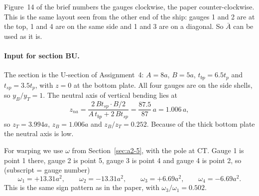 Figure~14 of the brief numbers the gauges clockwise, the paper counter-clockwise. This is the same layout seen from the other end of the ship: gauges 1 and 2 are at the top, 1 and 4 are on the same side and 1 and 3 are on a diagonal. So $\bar A$ can be used as it is.

\paragraph{Input for section BU.} The section is the U-section of Assignment~4: $A = 8a$, $B = 5a$, $t_{bp} = 6.5t_p$ and $t_{sp} = 3.5t_p$, with $z = 0$ at the bottom plate. All four gauges are on the side shells, so $y_B/y_T = 1$. The neutral axis of vertical bending lies at
\begin{equation}
  z_{na} = \frac{2\,Bt_{sp}\cdot B/2}{A\,t_{bp} + 2\,Bt_{sp}} = \frac{87.5}{87}\,a = 1.006\,a ,
\end{equation}
so $z_T = 3.994a$, $z_B = 1.006a$ and $z_B/z_T = 0.252$. Because of the thick bottom plate the neutral axis is low.

For warping we use $\omega$ from Section~\ref{sec:a2-5}, with the pole at CT. Gauge 1 is point 1 there, gauge 2 is point 5, gauge 3 is point 4 and gauge 4 is point 2, so (subscript = gauge number)
\begin{equation}
  \omega_1 = +13.31a^2,\qquad \omega_2 = -13.31a^2,\qquad \omega_3 = +6.69a^2,\qquad \omega_4 = -6.69a^2 .
\end{equation}
This is the same sign pattern as in the paper, with $\omega_3/\omega_1 = 0.502$.

